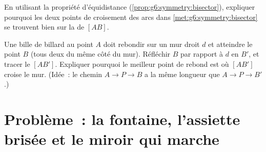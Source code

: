 \begin{exercise}[$\star\star$]\label{exo:g6:symmetry:11}
En utilisant la propriété d'équidistance
(\cref{prop:g6:symmetry:bisector}), expliquer pourquoi les deux points
de croisement des arcs dans \cref{met:g6:symmetry:bisector} se
trouvent bien sur la  de $[AB]$.
\end{exercise}

\begin{exercise}[$\star\star\star$]\label{exo:g6:symmetry:12}
Une bille de billard au point $A$ doit rebondir sur un mur droit $d$
et atteindre le point $B$ (tous deux du même côté du mur). Réfléchir
$B$ par rapport à $d$ en $B'$, et tracer le  $[AB']$. Expliquer
pourquoi le meilleur point de rebond est où $[AB']$ croise le mur.
(Idée~: le chemin $A \to P \to B$ a la même longueur que
$A \to P \to B'$.)
\end{exercise}

\section{Problème~: la fontaine, l'assiette brisée et le miroir qui
marche}

